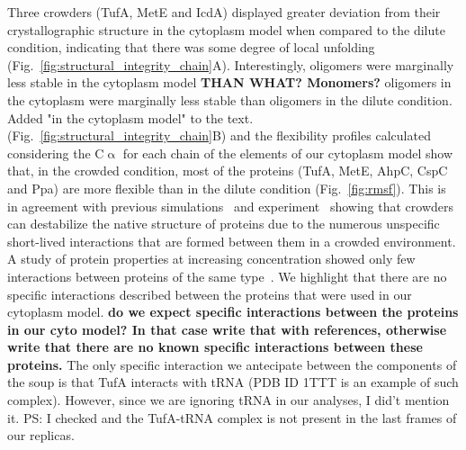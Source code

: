 \documentclass[journal=jcisd8,manuscript=article]{achemso}
\begin{document}
Three crowders (TufA, MetE and IcdA) displayed greater deviation from
their crystallographic structure in the cytoplasm model when compared
to the dilute condition, indicating that there was some degree of
local unfolding
(Fig.~\ref{fig:structural_integrity_chain}A). Interestingly, oligomers
were marginally less stable {\color{blue} in the cytoplasm model} {\bf THAN WHAT? Monomers?} {\color{blue} oligomers in the cytoplasm were marginally less stable than oligomers in the dilute condition. Added "in the cytoplasm model" to the text.}
(Fig.~\ref{fig:structural_integrity_chain}B) and the flexibility
profiles calculated considering the C$\upalpha$ for each chain of the
elements of our cytoplasm model show that, in the crowded condition,
most of the proteins (TufA, MetE, AhpC, CspC and Ppa) are more flexible than in the dilute condition (Fig.~\ref{fig:rmsf}). This
is in agreement with previous simulations~\cite{Feig2011} and
experiment~\cite{miklos2011,Wang2012b} showing that crowders can
destabilize the native structure of proteins due to the numerous
unspecific short-lived interactions that are formed between them in a
crowded environment. A study of protein properties at increasing
concentration showed only few interactions between proteins of the
same type~\cite{Bashardanesh2019a}. {\color{blue} We highlight that there are no specific interactions described between the proteins that were used in our cytoplasm model.} {\bf do we expect specific interactions between the proteins in our cyto model? In that case write that with references, otherwise write that there are no known specific interactions between these proteins.} {\color{blue} The only specific interaction we antecipate between the components of the soup is that TufA interacts with tRNA (PDB ID 1TTT is an example of such complex). However, since we are ignoring tRNA in our analyses, I did't mention it. PS: I checked and the TufA-tRNA complex is not present in the last frames of our replicas.}
\end{document}
